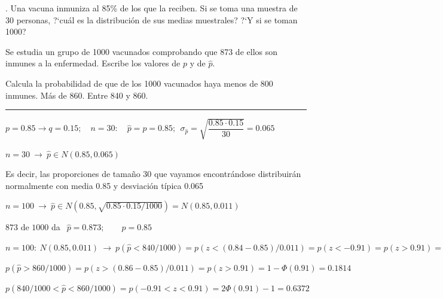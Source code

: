 \vspace{4mm}
\begin{example}
.	Una vacuna inmuniza al 85\% de los que la reciben. Si se toma una muestra de 30 personas, ?`cuál es la distribución de sus medias muestrales?  ?`Y si se toman 1000?

\vspace{2mm} Se estudia un grupo de 1000 vacunados	comprobando que 873 de ellos son inmunes a la enfermedad. Escribe los valores de $p$ y de $\widehat p$.

\vspace{2mm} Calcula la probabilidad de que de los 1000 vacunados haya menos de 800 inmunes. Más de 860. Entre 840 y 860.

\rule{150pt}{0.1pt}

\vspace{2mm} $p=0.85 \to q=0.15;\quad n=30:\quad \widehat p=p=0.85;\ \ \sigma_{\widehat p}=\sqrt{\dfrac{0.85\cdot 0.15}{30}}=0.065 $

\vspace{2mm} $n=30 \ \to \ \widehat p \in N(0.85,0.065)$

\vspace{2mm} Es decir, las proporciones de tamaño 30 que vayamos encontrándose distribuirán normalmente con media 0.85 y desviación típica 0.065

\vspace{2mm} $n=100 \ \to \ \widehat p \in N(0.85,\sqrt{0.85\cdot 0.15 / 1000})=N(0.85,0.011)$

\vspace{2mm} $873$ de $1000$ da $\ \ \widehat p=0.873;\qquad p=0.85$

\vspace{2mm} $n=100:\ N(0.85,0.011) \ \to \ p(\hat p <840/1000)=p(z<(0.84-0.85)/0.011)=p(z<-0.91)=p(z>0.91)=1-\Phi(0.91)=0.1814$

\vspace{2mm} $p(\widehat p>860/1000)=p(z>(0.86-0.85)/0.011)=p(z>0.91)=1-\Phi(0.91)=0.1814$

\vspace{2mm} $p(840/1000<\widehat p <860/1000)=p(-0.91<z<0.91)=2\Phi(0.91)-1=0.6372$

\end{example}


